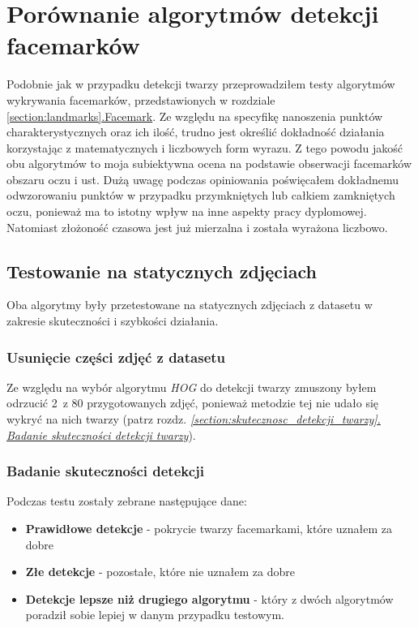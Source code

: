\newpage

\section{Porównanie algorytmów detekcji facemarków}

Podobnie jak w przypadku detekcji twarzy przeprowadziłem testy algorytmów wykrywania facemarków, przedstawionych w rozdziale \hyperref[section:landmarks]{\ref{section:landmarks}.Facemark}. Ze względu na specyfikę nanoszenia punktów charakterystycznych oraz ich ilość, trudno jest określić dokładność działania korzystając z matematycznych i liczbowych form wyrazu. Z tego powodu jakość obu algorytmów to moja subiektywna ocena na podstawie obserwacji facemarków obszaru oczu i ust. Dużą uwagę podczas opiniowania poświęcałem dokładnemu odwzorowaniu punktów w przypadku przymkniętych lub całkiem zamkniętych oczu, ponieważ ma to istotny wpływ na inne aspekty pracy dyplomowej. Natomiast złożoność czasowa jest już mierzalna i została wyrażona liczbowo. 

\subsection{Testowanie na statycznych zdjęciach}

Oba algorytmy były przetestowane na statycznych zdjęciach z datasetu w zakresie skuteczności i szybkości działania.

\subsubsection{Usunięcie części zdjęć z datasetu}
Ze względu na wybór algorytmu \textit{HOG} do detekcji twarzy zmuszony byłem odrzucić 2~z 80 przygotowanych zdjęć, ponieważ metodzie tej nie udało się wykryć na nich twarzy (patrz rozdz. \hyperref[{section:skutecznosc_detekcji_twarzy}]{\textit{\ref{section:skutecznosc_detekcji_twarzy}. Badanie skuteczności detekcji twarzy}}).

\subsubsection{Badanie skuteczności detekcji}

Podczas testu zostały zebrane następujące dane:

\begin{itemize}
    \item \textbf{Prawidłowe detekcje} - pokrycie twarzy facemarkami, które uznałem za dobre
    \item \textbf{Złe detekcje} - pozostałe, które nie uznałem za dobre
    \item \textbf{Detekcje lepsze niż drugiego algorytmu} - który z dwóch algorytmów poradził sobie lepiej w danym przypadku testowym. 
\end{itemize}

